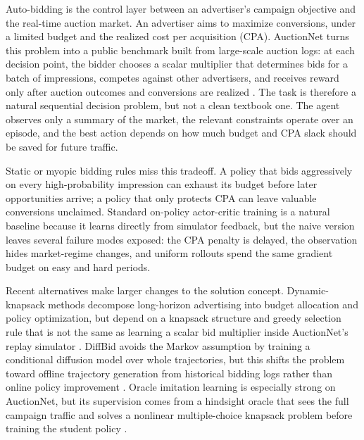 \documentclass{article}
\begin{document}

Auto-bidding is the control layer between an advertiser's campaign objective and
the real-time auction market. An advertiser aims to maximize conversions, under
a limited budget and the realized cost per acquisition (CPA).
AuctionNet turns this problem into a public benchmark built from large-scale
auction logs: at each decision point, the bidder chooses a scalar multiplier
that determines bids for a batch of impressions, competes against other
advertisers, and receives reward only after auction outcomes and conversions are
realized \citep{su2024auctionnet,xu2024autobidding}. The task is therefore a
natural sequential decision problem, but not a clean textbook one. The agent
observes only a summary of the market, the relevant constraints operate over an
episode, and the best action depends on how much budget and CPA slack should be
saved for future traffic.

Static or myopic bidding rules miss this tradeoff. A policy that bids
aggressively on every high-probability impression can exhaust its budget before
later opportunities arrive; a policy that only protects CPA can leave valuable
conversions unclaimed. Standard on-policy actor-critic training is a natural
baseline because it learns directly from simulator feedback, but the naive
version leaves several failure modes exposed: the CPA penalty is delayed, the
observation hides market-regime changes, and uniform rollouts spend the same
gradient budget on easy and hard periods.

Recent alternatives make larger changes to the solution concept.
Dynamic-knapsack methods decompose long-horizon advertising into budget
allocation and policy optimization, but depend on a knapsack structure and
greedy selection rule that is not the same as learning a scalar bid multiplier
inside AuctionNet's replay simulator \citep{hao2020dynamic}. DiffBid avoids the
Markov assumption by training a conditional diffusion model over whole
trajectories, but this shifts the problem toward offline trajectory generation
from historical bidding logs rather than online policy improvement
\citep{guo2024generative}. Oracle imitation learning is especially strong on
AuctionNet, but its supervision comes from a hindsight oracle that sees the full
campaign traffic and solves a nonlinear multiple-choice knapsack problem before
training the student policy \citep{chiappa2025autobidding}.
\end{document}
